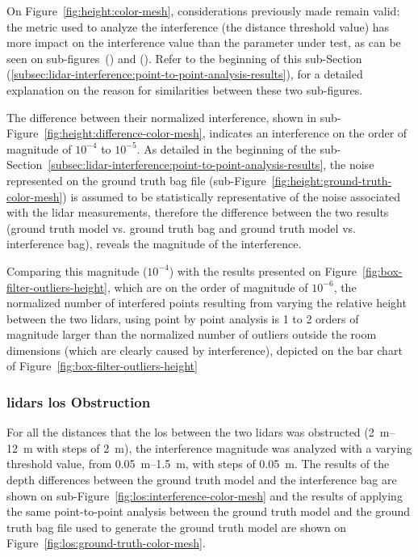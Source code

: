 On Figure~\ref{fig:height:color-mesh}, considerations previously made remain valid: the metric used to analyze the interference (the distance threshold value) has more impact on the interference value than the parameter under test, as can be seen on sub-figures~() and (). Refer to the beginning of this sub-Section (\ref{subsec:lidar-interference:point-to-point-analysis-results}), for a detailed explanation on the reason for similarities between these two sub-figures. 

The difference between their normalized interference, shown in sub-Figure~\ref{fig:height:difference-color-mesh}, indicates an interference on the order of magnitude of $10^{-4}$ to $10^{-5}$. As detailed in the beginning of the sub-Section~\ref{subsec:lidar-interference:point-to-point-analysis-results}, the noise represented on the ground truth bag file (sub-Figure~\ref{fig:height:ground-truth-color-mesh}) is assumed to be statistically representative of the noise associated with the \ac{lidar} measurements, therefore the difference between the two results (ground truth model vs. ground truth bag and ground truth model vs. interference bag), reveals the magnitude of the interference. 

Comparing this magnitude ($10^{-4}$) with the results presented on Figure~\ref{fig:box-filter-outliers-height}, which are on the order of magnitude of $10^{-6}$, the normalized number of interfered points resulting from varying the relative height between the two \acp{lidar}, using point by point analysis is 1 to 2 orders of magnitude larger than the normalized number of outliers outside the room dimensions (which are clearly caused by interference), depicted on the bar chart of Figure~\ref{fig:box-filter-outliers-height}

\subsubsection{\acp{lidar} \acl{los} Obstruction}
For all the distances that the \acf{los} between the two \acp{lidar} was obstructed (\SIrange{2}{12}{\meter} with steps of \SI{2}{\meter}), the interference magnitude was analyzed with a varying threshold value, from \SIrange{0.05}{1.5}{\meter}, with steps of \SI{0.05}{\meter}. The results of the depth differences between the ground truth model and the interference bag are shown on sub-Figure~\ref{fig:los:interference-color-mesh} and the results of applying the same point-to-point analysis between the ground truth model and the ground truth bag file used to generate the ground truth model are shown on Figure~\ref{fig:los:ground-truth-color-mesh}.

